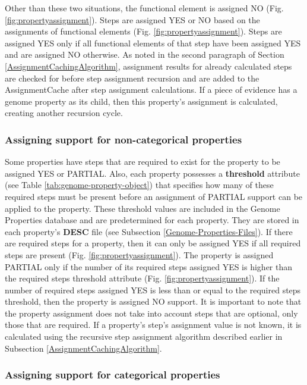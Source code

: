 Other than these two situations, the functional element is assigned NO (Fig. 
\ref{fig:propertyassignment}). Steps are assigned YES or NO based on the 
assignments of functional elements (Fig. \ref{fig:propertyassignment}). Steps 
are assigned YES only if all functional elements of that step have been assigned 
YES and are assigned NO otherwise. As noted in the second paragraph of Section 
\ref{AssignmentCachingAlgorithm}, assignment results for already calculated 
steps are checked for before step assignment recursion and are added to the 
AssignmentCache after step assignment calculations. If a piece of evidence has a 
genome property as its child, then this property's assignment is calculated, 
creating another recursion cycle.

\subsubsection{Assigning support for non-categorical properties}

Some properties have steps that are required to exist for the property to be 
assigned YES or PARTIAL. Also, each property possesses a \textbf{threshold} 
attribute (see Table \ref{tab:genome-property-object}) that specifies how many 
of these required steps must be present before an assignment of PARTIAL support 
can be applied to the property. These threshold values are included in the 
Genome Properties database and are predetermined for each property. They are 
stored in each property's \textbf{DESC} file (see Subsection 
\ref{Genome-Properties-Files}). If there are required steps for a property, then 
it can only be assigned YES if all required steps are present (Fig. 
\ref{fig:propertyassignment}). The property is assigned PARTIAL only if the 
number of its required steps assigned YES is higher than the required steps 
threshold attribute (Fig. \ref{fig:propertyassignment}). If the number of 
required steps assigned YES is less than or equal to the required steps 
threshold, then the property is assigned NO support. It is important to note 
that the property assignment does not take into account steps that are optional, 
only those that are required. If a property's step's assignment value is not 
known, it is calculated using the recursive step assignment algorithm described 
earlier in Subsection \ref{AssignmentCachingAlgorithm}.

\subsubsection{Assigning support for categorical properties}

